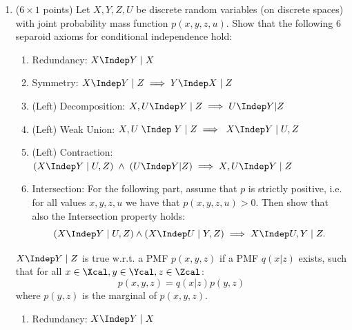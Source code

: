 \begin{enumerate}
\begin{gradedsolution}
  Hence, for any joint distribution $P(X, Y|Z=z)$, we only need to check if the matrix $p(x, y|z)$ is rank-one, as it can then be written as $p(x,y|z)=p(x|z)p(y|z)$. This is here the case.

  Alternatively, it's easy to read off $p(x|z)$ and $p(y|z)$ from the joint distribution and verify $p(x,y|z)=p(x|z)p(y|z)$, or read off $p(x|z)$ and $p(x|y,z)$ and verify $p(x|z) = p(x|y,z)$.
\end{gradedsolution}

\item ($6 \times 1$ points) Let $X,Y,Z,U$ be discrete random variables (on discrete spaces) with joint probability mass function $p(x,y,z,u)$. Show that the following 6 separoid axioms for conditional independence hold:

\begin{enumerate}
  \item Redundancy: $X \Indep Y \;|\; X$

  \item Symmetry: $X \Indep Y\; |\; Z \implies Y \Indep X\; |\; Z$ 

  \item (Left) Decomposition: $X, U \Indep Y \; | \; Z \implies U \Indep Y | Z\; $

  \item (Left) Weak Union: $X,U \;\Indep \;  Y \; | \; Z \implies  \; X \Indep Y \; |\; U,Z $

  \item (Left) Contraction: $(X \Indep Y\; |\; U, Z) \; \land \; (U \Indep Y | Z) \implies X, U \Indep Y \; | \; Z$ \\

  \item Intersection: For the following part, assume that $p$ is strictly positive, i.e. for all values $x,y,z,u$ we have that $p(x, y, z, u) > 0$. Then show that also the Intersection property holds:
  $$(X \Indep Y \;|\;U,Z) \land (X \Indep U \; | \; Y,Z)  \implies  X \Indep U,Y \; | \; Z.$$
\end{enumerate}

\begin{gradedsolution}
  $X \Indep Y \; | \; Z$ is true w.r.t. a PMF $p(x, y, z)$ if a PMF $q(x|z)$ exists, such that for all $x \in \Xcal, y \in \Ycal, z \in \Zcal$:
  \[
    p(x,y,z)=q(x|z)p(y,z)
  \]
  where $p(y,z)$ is the marginal of $p(x,y,z)$.
  \begin{enumerate}
    \item Redundancy: $X \Indep Y \;|\; X$


\end{enumerate}
\end{gradedsolution}
\end{enumerate}
